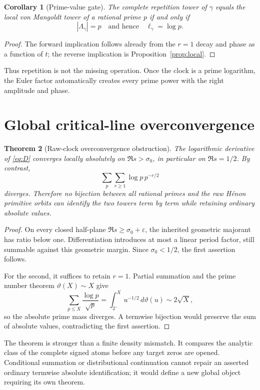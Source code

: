 \documentclass[11pt]{article}
\newtheorem{theorem}{Theorem}[section]
\newtheorem{corollary}[theorem]{Corollary}
\theoremstyle{remark}\newtheorem{remark}[theorem]{Remark}
\begin{document}
\begin{corollary}[Prime-value gate]\label{cor:prime}
The complete repetition tower of $\gamma$ equals the local von Mangoldt
tower of a rational prime $p$ if and only if
\[
|\Lambda_\gamma|=p
\quad\text{and hence}\quad \ell_\gamma=\log p.
\]
\end{corollary}
\begin{proof}
The forward implication follows already from the $r=1$ decay and phase as a
function of $t$; the reverse implication is Proposition~\ref{prop:local}.
\end{proof}

Thus repetition is not the missing operation.  Once the clock is a prime
logarithm, the Euler factor automatically creates every prime power with the
right amplitude and phase.

\section{Global critical-line overconvergence}
\begin{theorem}[Raw-clock overconvergence obstruction]\label{thm:over}
The logarithmic derivative of \eqref{eq:D} converges locally absolutely on
$\Re s>\sigma_0$, in particular on $\Re s=1/2$.  By contrast,
\[
\sum_p\sum_{r\ge1}\log p\,p^{-r/2}
\]
diverges.  Therefore no bijection between all rational primes and the raw
H\'enon primitive orbits can identify the two towers term by term while
retaining ordinary absolute values.
\end{theorem}
\begin{proof}
On every closed half-plane $\Re s\ge\sigma_0+\varepsilon$, the inherited
geometric majorant has ratio below one.  Differentiation introduces at most a
linear period factor, still summable against this geometric margin.  Since
$\sigma_0<1/2$, the first assertion follows.

For the second, it suffices to retain $r=1$.  Partial summation and the prime
number theorem $\vartheta(X)\sim X$ give
\[
\sum_{p\le X}\frac{\log p}{\sqrt p}
=\int_{2^-}^X u^{-1/2}\,d\vartheta(u)
\sim2\sqrt X,
\]
so the absolute prime mass diverges.  A termwise bijection would preserve the
sum of absolute values, contradicting the first assertion.
\end{proof}

The theorem is stronger than a finite density mismatch.  It compares the
analytic class of the complete signed atoms before any target zeros are
opened.  Conditional summation or distributional continuation cannot repair
an asserted ordinary termwise absolute identification; it would define a
new global object requiring its own theorem.
\end{document}
